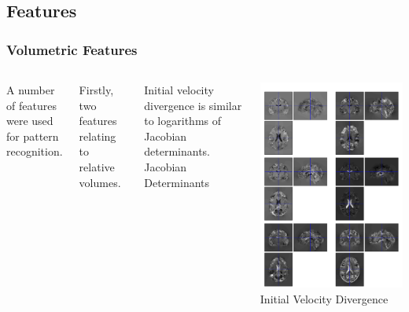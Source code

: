 \documentclass{beamer}
\begin{document}
\subsection{Features}
\begin{frame}
\frametitle{Volumetric Features}
\begin{columns}[c]
A number of features were used for pattern recognition.

Firstly, two features relating to relative volumes.

Initial velocity divergence is similar to logarithms of Jacobian determinants.
Jacobian Determinants

\includegraphics[width=1\textwidth]{jac_ixi}
Initial Velocity Divergence

\end{columns}
\end{frame}
\end{document}
